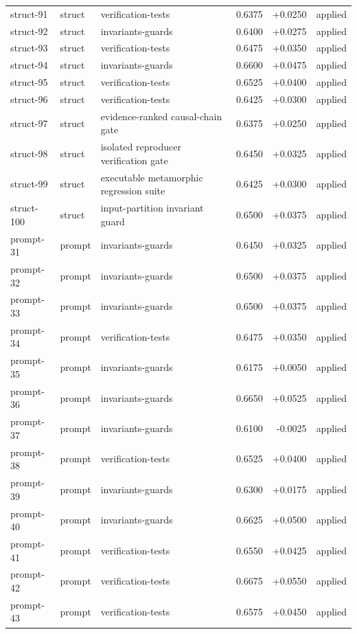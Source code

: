 \begin{center}
\begin{longtable}{llp{5.2cm}rrl}
struct-91 & struct & verification-tests & 0.6375 & +0.0250 & applied \\
struct-92 & struct & invariants-guards & 0.6400 & +0.0275 & applied \\
struct-93 & struct & verification-tests & 0.6475 & +0.0350 & applied \\
struct-94 & struct & invariants-guards & 0.6600 & +0.0475 & applied \\
struct-95 & struct & verification-tests & 0.6525 & +0.0400 & applied \\
struct-96 & struct & verification-tests & 0.6425 & +0.0300 & applied \\
struct-97 & struct & evidence-ranked causal-chain gate & 0.6375 & +0.0250 & applied \\
struct-98 & struct & isolated reproducer verification gate & 0.6450 & +0.0325 & applied \\
struct-99 & struct & executable metamorphic regression suite & 0.6425 & +0.0300 & applied \\
struct-100 & struct & input-partition invariant guard & 0.6500 & +0.0375 & applied \\
prompt-31 & prompt & invariants-guards & 0.6450 & +0.0325 & applied \\
prompt-32 & prompt & invariants-guards & 0.6500 & +0.0375 & applied \\
prompt-33 & prompt & invariants-guards & 0.6500 & +0.0375 & applied \\
prompt-34 & prompt & verification-tests & 0.6475 & +0.0350 & applied \\
prompt-35 & prompt & invariants-guards & 0.6175 & +0.0050 & applied \\
prompt-36 & prompt & invariants-guards & 0.6650 & +0.0525 & applied \\
prompt-37 & prompt & invariants-guards & 0.6100 & -0.0025 & applied \\
prompt-38 & prompt & verification-tests & 0.6525 & +0.0400 & applied \\
prompt-39 & prompt & invariants-guards & 0.6300 & +0.0175 & applied \\
prompt-40 & prompt & invariants-guards & 0.6625 & +0.0500 & applied \\
prompt-41 & prompt & verification-tests & 0.6550 & +0.0425 & applied \\
prompt-42 & prompt & verification-tests & 0.6675 & +0.0550 & applied \\
prompt-43 & prompt & verification-tests & 0.6575 & +0.0450 & applied \\

\end{longtable}
\end{center}
